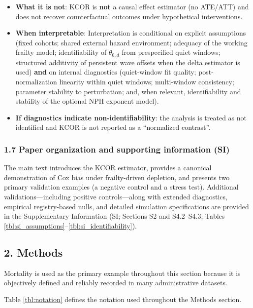 \documentclass[
]{article}
\renewenvironment{quote}{\begin{mdframed}[style=kcorquote]}{\end{mdframed}}
\begin{document}
\begin{quote}
\begin{itemize}
  automatically causal.
\item
  \textbf{What it is not}: KCOR is \textbf{not} a causal effect
  estimator (no ATE/ATT) and does not recover counterfactual outcomes
  under hypothetical interventions.
\item
  \textbf{When interpretable}: Interpretation is conditional on explicit
  assumptions (fixed cohorts; shared external hazard environment;
  adequacy of the working frailty model; identifiability of
  \(\theta_{0,d}\) from prespecified quiet windows; structured
  additivity of persistent wave offsets when the delta estimator is
  used) \textbf{and} on internal diagnostics (quiet-window fit quality;
  post-normalization linearity within quiet windows; multi-window
  consistency; parameter stability to perturbation; and, when relevant,
  identifiability and stability of the optional NPH exponent model).
\item
  \textbf{If diagnostics indicate non-identifiability}: the analysis is
  treated as not identified and KCOR is not reported as a ``normalized
  contrast''.
\end{itemize}
\end{quote}

\subsubsection{1.7 Paper organization and supporting information
(SI)}\label{paper-organization-and-supporting-information-si}

The main text introduces the KCOR estimator, provides a canonical
demonstration of Cox bias under frailty-driven depletion, and presents
two primary validation examples (a negative control and a stress test).
Additional validations---including positive controls---along with
extended diagnostics, empirical registry-based nulls, and detailed
simulation specifications are provided in the Supplementary Information
(SI; Sections S2 and S4.2--S4.3; Tables
\ref{tbl:si_assumptions}--\ref{tbl:si_identifiability}).

\subsection{2. Methods}\label{methods}

Mortality is used as the primary example throughout this section because
it is objectively defined and reliably recorded in many administrative
datasets.

Table \ref{tbl:notation} defines the notation used throughout the
Methods section.
\end{document}
